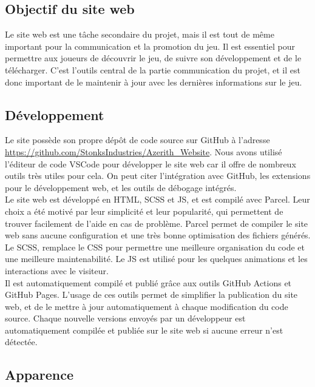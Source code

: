 

\subsection{Objectif du site web}

Le site web est une tâche secondaire du projet, mais il est tout de même important pour la communication et la promotion du jeu.
Il est essentiel pour permettre aux joueurs de découvrir le jeu, de suivre son développement et de le télécharger.
C'est l'outils central de la partie communication du projet, et il est donc important de le maintenir à jour avec les dernières informations sur le jeu.

\subsection{Développement}

Le site possède son propre dépôt de code source sur GitHub à l'adresse \url{https://github.com/StonksIndustries/Azerith_Website}.
Nous avons utilisé l'éditeur de code VSCode pour développer le site web car il offre de nombreux outils très utiles pour cela.
On peut citer l'intégration avec GitHub, les extensions pour le développement web, et les outils de débogage intégrés.
\\

Le site web est développé en HTML, SCSS et JS, et est compilé avec Parcel.
Leur choix a été motivé par leur simplicité et leur popularité, qui permettent de trouver facilement de l'aide en cas de problème.
Parcel permet de compiler le site web sans aucune configuration et une très bonne optimisation des fichiers générés.
Le SCSS, remplace le CSS pour permettre une meilleure organisation du code et une meilleure maintenabilité.
Le JS est utilisé pour les quelques animations et les interactions avec le visiteur.
\\

Il est automatiquement compilé et publié grâce aux outils GitHub Actions et GitHub Pages.
L'usage de ces outils permet de simplifier la publication du site web, et de le mettre à jour automatiquement à chaque modification du code source.
Chaque nouvelle versions envoyés par un développeur est automatiquement compilée et publiée sur le site web si aucune erreur n'est détectée.

\subsection{Apparence}

